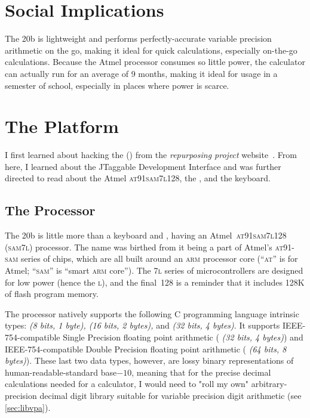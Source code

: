 \documentclass{LibHP20b}
\begin{document}
\section{Social Implications}

The 20b is lightweight and performs perfectly-accurate variable precision arithmetic on the go, making it ideal for quick calculations, especially on-the-go calculations. Because the Atmel processor consumes so little power, the calculator can actually run for an average of 9 months, making it ideal for usage in a semester of school, especially in places where power is scarce. 

\section{The Platform}

I first learned about hacking the \HP[hp] () from the \emph{\HP[hp] repurposing project} website~\cite{hp20b-repurposing}. From here, I learned about the JTaggable Development Interface and was further directed to read about the Atmel \textsc{at91sam7l128}, the \LCD{}, and the keyboard.

\subsection{The Processor}

The 20b is little more than a keyboard and \LCD{}, having an Atmel~\textsc{at91sam7l128} (\textsc{sam7l}) processor. The name was birthed from it being a part of Atmel's \textsc{at91}-\\\textsc{sam} series of chips, which are all built around an \textsc{arm} processor core (``\textsc{at}'' is for Atmel;
``\textsc{sam}'' is ``smart \textsc{arm} core''). The \textsc{7l} series of microcontrollers are designed for low power (hence the \textsc{l}), and the final~128 is a reminder that it includes 128K of flash program memory.

The processor natively supports the following C programming language intrinsic types: \emph{ (8 bits, 1 byte),  (16 bits, 2 bytes),} and \emph{ (32 bits, 4 bytes)}. It supports IEEE-754-compatible Single Precision floating point arithmetic (\emph{ (32 bits, 4 bytes)}) and IEEE-754-compatible Double Precision floating point arithmetic (\emph{ (64 bits, 8 bytes)}). These last two data types, however, are lossy binary representations of human-readable-standard base$-10$, meaning that for the precise decimal calculations needed for a calculator, I would need to "roll my own" arbitrary-precision decimal digit library suitable for variable precision digit arithmetic (see \ref{sec:libvpa}).
\end{document}
